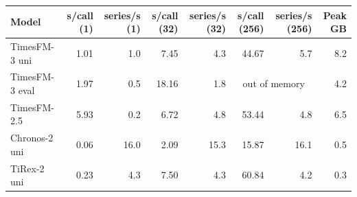 \begin{tabular}{lrrrrrrr}
\toprule
Model & s/call (1) & series/s (1) & s/call (32) & series/s (32) & s/call (256) & series/s (256) & Peak GB \\
\midrule
TimesFM-3 uni & 1.01 & 1.0 & 7.45 & 4.3 & 44.67 & 5.7 & 8.2 \\
TimesFM-3 eval & 1.97 & 0.5 & 18.16 & 1.8 & \multicolumn{2}{c}{out of memory} & 4.2 \\
TimesFM-2.5 & 5.93 & 0.2 & 6.72 & 4.8 & 53.44 & 4.8 & 6.5 \\
Chronos-2 uni & 0.06 & 16.0 & 2.09 & 15.3 & 15.87 & 16.1 & 0.5 \\
TiRex-2 uni & 0.23 & 4.3 & 7.50 & 4.3 & 60.84 & 4.2 & 0.3 \\
\bottomrule
\end{tabular}
